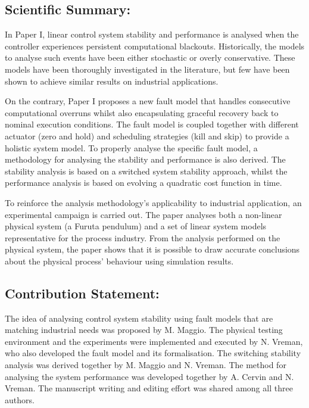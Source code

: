 \documentclass{article}
\begin{document}
\subsection*{Scientific Summary:}%
%
In Paper I, linear control system stability and performance is analysed when the controller experiences persistent computational blackouts.
Historically, the models to analyse such events have been either stochastic or overly conservative.
These models have been thoroughly investigated in the literature, but few have been shown to achieve similar results on industrial applications.

On the contrary, Paper I proposes a new fault model that handles consecutive computational overruns whilst also encapsulating graceful recovery back to nominal execution conditions.
The fault model is coupled together with different actuator (zero and hold) and scheduling strategies (kill and skip) to provide a holistic system model.
To properly analyse the specific fault model, a methodology for analysing the stability and performance is also derived.
The stability analysis is based on a switched system stability approach, whilst the performance analysis is based on evolving a quadratic cost function in time.

To reinforce the analysis methodology's applicability to industrial application, an experimental campaign is carried out.
The paper analyses both a non-linear physical system (a Furuta pendulum) and a set of linear system models representative for the process industry.
From the analysis performed on the physical system, the paper shows that it is possible to draw accurate conclusions about the physical process' behaviour using simulation results.

\subsection*{Contribution Statement:}%
%
The idea of analysing control system stability using fault models that are matching industrial needs was proposed by M. Maggio.
The physical testing environment and the experiments were implemented and executed by N. Vreman, who also developed the fault model and its formalisation.
The switching stability analysis was derived together by M. Maggio and N. Vreman.
The method for analysing the system performance was developed together by A. Cervin and N. Vreman.
The manuscript writing and editing effort was shared among all three authors.

\end{document}

